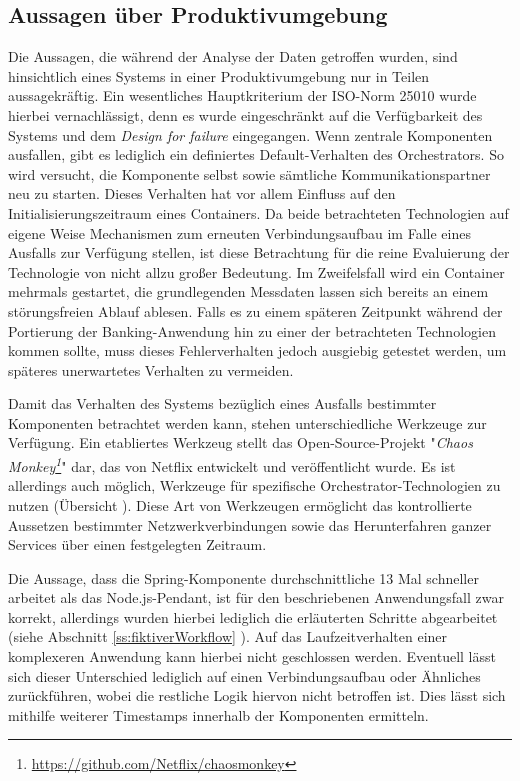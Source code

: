 \subsection{Aussagen über Produktivumgebung}
Die Aussagen, die während der Analyse der Daten getroffen wurden, sind hinsichtlich eines Systems in einer Produktivumgebung nur in Teilen aussagekräftig. Ein wesentliches Hauptkriterium der ISO-Norm 25010 wurde hierbei vernachlässigt, denn es wurde eingeschränkt auf die Verfügbarkeit des Systems und dem \emph{Design for failure} eingegangen. Wenn zentrale Komponenten ausfallen, gibt es lediglich ein definiertes Default-Verhalten des Orchestrators. So wird versucht, die Komponente selbst sowie sämtliche Kommunikationspartner neu zu starten. Dieses Verhalten hat vor allem Einfluss auf den Initialisierungszeitraum eines Containers. Da beide betrachteten Technologien auf eigene Weise Mechanismen zum erneuten Verbindungsaufbau im Falle eines Ausfalls zur Verfügung stellen, ist diese Betrachtung für die reine Evaluierung der Technologie von nicht allzu großer Bedeutung. Im Zweifelsfall wird ein Container mehrmals gestartet, die grundlegenden Messdaten lassen sich bereits an einem störungsfreien Ablauf ablesen. Falls es zu einem späteren Zeitpunkt während der Portierung der Banking-Anwendung hin zu einer der betrachteten Technologien kommen sollte, muss dieses Fehlerverhalten jedoch ausgiebig getestet werden, um späteres unerwartetes Verhalten zu vermeiden. 

Damit das Verhalten des Systems bezüglich eines Ausfalls bestimmter Komponenten betrachtet werden kann, stehen unterschiedliche Werkzeuge zur Verfügung. Ein etabliertes Werkzeug stellt das Open-Source-Projekt "\emph{Chaos Monkey\footnote{\url{https://github.com/Netflix/chaosmonkey}}}" dar, das von Netflix entwickelt und veröffentlicht wurde. Es ist allerdings auch möglich, Werkzeuge für spezifische Orchestrator-Technologien zu nutzen (Übersicht \cite[Seite~369]{continuous-delivery}). Diese Art von Werkzeugen ermöglicht das kontrollierte Aussetzen bestimmter Netzwerkverbindungen sowie das Herunterfahren ganzer Services über einen festgelegten Zeitraum. 

Die Aussage, dass die Spring-Komponente durchschnittliche 13 Mal schneller arbeitet als das Node.js-Pendant, ist für den beschriebenen Anwendungsfall zwar korrekt, allerdings wurden hierbei lediglich die erläuterten Schritte abgearbeitet (siehe Abschnitt \ref{ss:fiktiverWorkflow} ). Auf das Laufzeitverhalten einer komplexeren Anwendung kann hierbei nicht geschlossen werden. Eventuell lässt sich dieser Unterschied lediglich auf einen Verbindungsaufbau oder Ähnliches zurückführen, wobei die restliche Logik hiervon nicht betroffen ist. Dies lässt sich mithilfe weiterer Timestamps innerhalb der Komponenten ermitteln.

